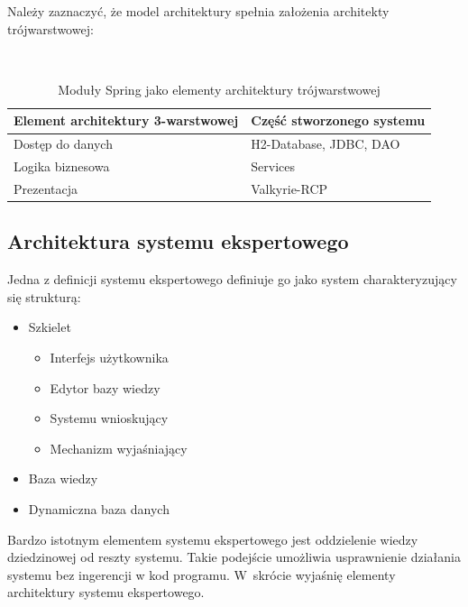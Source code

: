 Należy zaznaczyć, że model architektury spełnia założenia architekty trójwarstwowej:
\begin{table}[h]
 \caption{Moduły Spring jako elementy architektury trójwarstwowej}
 \small\tt
 \centering
 \vspace{0in}
 \begin{tabular}{|l|l|}
 \hline
 \textbf{Element architektury 3-warstwowej} & \textbf{Część stworzonego systemu} \\ 
 \hline
 Dostęp do danych & H2-Database, JDBC, DAO \\
 \hline
 Logika biznesowa & Services \\
 \hline
 Prezentacja & Valkyrie-RCP \\
 \hline
 \end{tabular}
\end{table}

\subsection{Architektura systemu ekspertowego}
\label{sec:architekturaSystemuEkspertowego}
Jedna z definicji systemu ekspertowego definiuje go jako system charakteryzujący się strukturą:
\begin{itemize}
 \item Szkielet
       \begin{itemize}
	 \item Interfejs użytkownika
	 \item Edytor bazy wiedzy
	 \item Systemu wnioskujący
	 \item Mechanizm wyjaśniający
       \end{itemize}
 \item Baza wiedzy
 \item Dynamiczna baza danych
\end{itemize}

Bardzo istotnym elementem systemu ekspertowego jest oddzielenie wiedzy dziedzinowej od reszty systemu. Takie podejście umożliwia usprawnienie działania systemu bez ingerencji w kod programu. W~skrócie wyjaśnię elementy architektury systemu ekspertowego.

